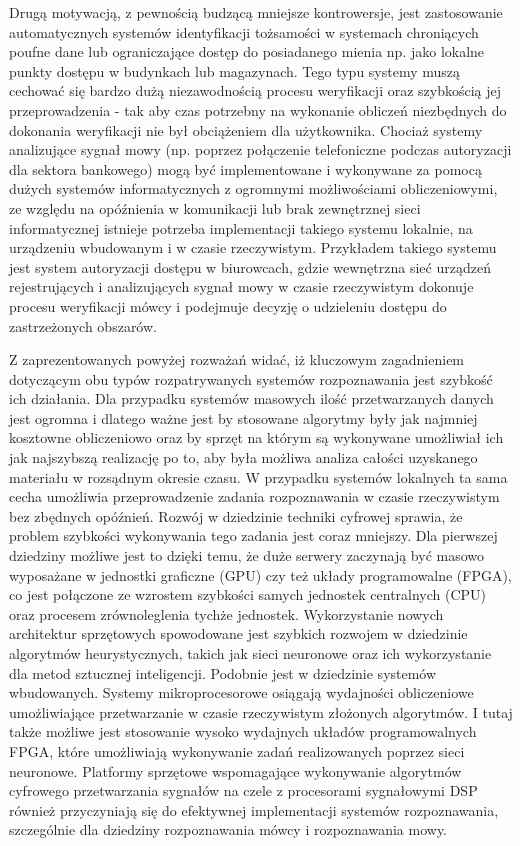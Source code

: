 Drugą motywacją, z pewnością budzącą mniejsze kontrowersje, jest zastosowanie automatycznych systemów identyfikacji tożsamości w systemach chroniących poufne dane lub ograniczające dostęp do posiadanego mienia np. jako lokalne punkty dostępu w budynkach lub magazynach. Tego typu systemy muszą cechować się bardzo dużą niezawodnością procesu weryfikacji oraz szybkością jej przeprowadzenia - tak aby czas potrzebny na wykonanie obliczeń niezbędnych do dokonania weryfikacji nie był obciążeniem dla
użytkownika. Chociaż systemy analizujące sygnał mowy (np. poprzez połączenie telefoniczne podczas autoryzacji dla sektora bankowego) mogą być implementowane i wykonywane za pomocą dużych systemów informatycznych z ogromnymi możliwościami obliczeniowymi, ze względu na opóźnienia w komunikacji lub brak zewnętrznej sieci informatycznej istnieje potrzeba implementacji takiego systemu lokalnie, na urządzeniu wbudowanym i w czasie rzeczywistym. Przykładem takiego systemu jest system autoryzacji dostępu w biurowcach, gdzie wewnętrzna sieć urządzeń rejestrujących i analizujących sygnał mowy w czasie rzeczywistym dokonuje procesu weryfikacji mówcy i podejmuje decyzję o udzieleniu dostępu do zastrzeżonych obszarów.

Z zaprezentowanych powyżej rozważań widać, iż kluczowym zagadnieniem dotyczącym obu typów rozpatrywanych systemów rozpoznawania jest szybkość ich działania. Dla przypadku systemów masowych ilość przetwarzanych danych jest ogromna i dlatego ważne jest by stosowane algorytmy były jak najmniej kosztowne obliczeniowo oraz by sprzęt na którym są wykonywane umożliwiał ich jak najszybszą realizację po to, aby była możliwa analiza całości uzyskanego materiału w rozsądnym
okresie czasu. W przypadku systemów lokalnych ta sama cecha umożliwia przeprowadzenie zadania rozpoznawania w czasie rzeczywistym bez zbędnych opóźnień. Rozwój w dziedzinie techniki cyfrowej sprawia, że problem szybkości wykonywania tego zadania jest coraz mniejszy. Dla pierwszej dziedziny możliwe jest to dzięki temu, że duże serwery zaczynają być masowo wyposażane w jednostki graficzne (GPU) czy też układy programowalne (FPGA), co jest połączone ze wzrostem szybkości samych jednostek centralnych (CPU) oraz procesem zrównoleglenia tychże jednostek. Wykorzystanie nowych architektur sprzętowych spowodowane jest szybkich rozwojem w dziedzinie algorytmów heurystycznych, takich jak sieci neuronowe oraz ich wykorzystanie dla metod sztucznej inteligencji. Podobnie jest w dziedzinie systemów wbudowanych. Systemy mikroprocesorowe osiągają wydajności obliczeniowe umożliwiające przetwarzanie w czasie rzeczywistym złożonych algorytmów. I tutaj także możliwe jest stosowanie wysoko wydajnych układów programowalnych FPGA, które umożliwiają wykonywanie zadań realizowanych poprzez sieci neuronowe. Platformy sprzętowe wspomagające wykonywanie algorytmów cyfrowego przetwarzania sygnałów na czele z procesorami sygnałowymi DSP również przyczyniają się do efektywnej implementacji systemów rozpoznawania, szczególnie dla dziedziny rozpoznawania mówcy i rozpoznawania mowy.

